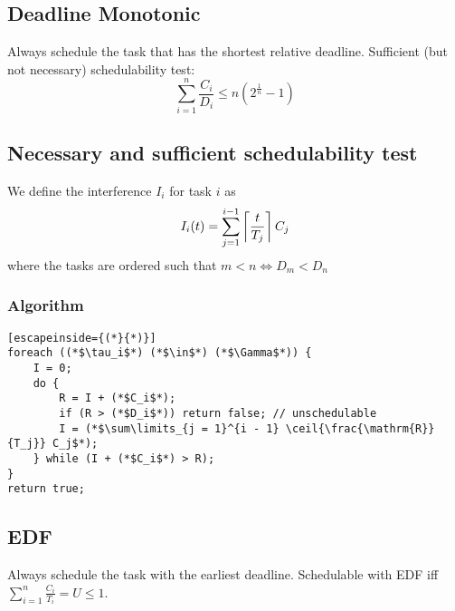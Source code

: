 \subsection{Deadline Monotonic}
Always schedule the task that has the shortest relative deadline.
Sufficient (but not necessary) schedulability test:
\begin{equation*}
	\sum_{i = 1}^n \frac{C_i}{D_i} \leq n \left( 2^{\frac{1}{n}} - 1 \right)
\end{equation*}

\subsection{Necessary and sufficient schedulability test}
We define the interference $I_i$ for task $i$ as
\begin{equation*}
	I_i(t) = \sum_{j = 1}^{i - 1} \left\lceil \frac{t}{T_j} \right\rceil C_j
\end{equation*}
where the tasks are ordered such that $m < n \iff D_m < D_n$

\subsubsection{Algorithm}
\begin{lstlisting}[escapeinside={(*}{*)}]
foreach ((*$\tau_i$*) (*$\in$*) (*$\Gamma$*)) {
	I = 0;
	do {
		R = I + (*$C_i$*);
		if (R > (*$D_i$*)) return false; // unschedulable
		I = (*$\sum\limits_{j = 1}^{i - 1} \ceil{\frac{\mathrm{R}}{T_j}} C_j$*);
	} while (I + (*$C_i$*) > R);
}
return true;
\end{lstlisting}

\subsection{EDF}
Always schedule the task with the earliest deadline.
Schedulable with EDF iff $\sum\limits_{i = 1}^{n} \frac{C_i}{T_i} = U \leq 1$.
